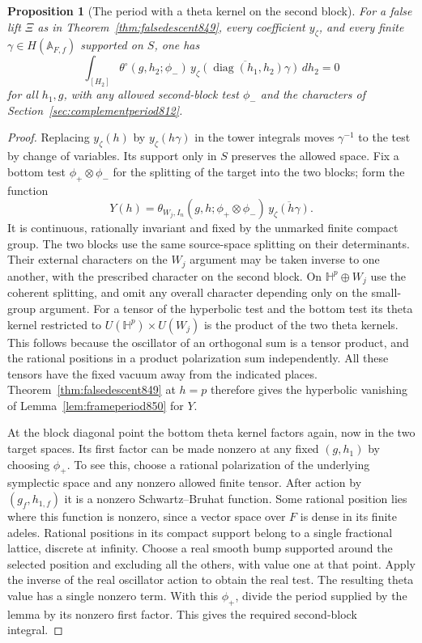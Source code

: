 \documentclass[a4paper,11pt]{article}
\newtheorem{proposition}{Proposition}[section]
\theoremstyle{definition}
\theoremstyle{remark}
\numberwithin{equation}{section}
\begin{document}
\begin{proposition}[The period with a theta kernel on the second block]
\leavevmode\label{prop:kernelperiod850}
For a false lift \(\Xi\) as in Theorem~\ref{thm:falsedescent849},
every coefficient \(y_\zeta\), and every finite
\(\gamma\in H(\mathbb A_{F,f})\) supported on \(S\), one has
\[
 \int_{[H_2]} \theta^\circ(g,h_2;\phi_-)\,
      \overline{y_\zeta(\operatorname{diag}(h_1,h_2)\gamma)}\,dh_2=0
\]
for all \(h_1,g\), with any allowed second-block test \(\phi_-\)
and the characters of Section~\ref{sec:complementperiod812}.
\end{proposition}
\begin{proof}
Replacing \(y_\zeta(h)\) by \(y_\zeta(h\gamma)\) in the tower
integrals moves \(\gamma^{-1}\) to the test by change of variables.
Its support only in \(S\) preserves the allowed space. Fix a
bottom test \(\phi_+\otimes\phi_-\) for the splitting of the
target into the two blocks; form the function
\[
        Y(h)=\theta_{W_j,I_n}(g,h;\phi_+\otimes\phi_-)\,
                                      \overline{y_\zeta(h\gamma)} .
\]
It is continuous, rationally invariant and fixed by the unmarked
finite compact group. The two blocks use the same source-space
splitting on their determinants. Their external characters on
the \(W_j\) argument may be taken inverse to one another,
with the prescribed character on the second block. On
\(\mathbb H^p\oplus W_j\) use the coherent splitting, and omit
any overall character depending only on the small-group argument.
For a tensor of the hyperbolic test and the bottom test its
theta kernel restricted to \(U(\mathbb H^p)\times U(W_j)\)
is the product of the two theta kernels. This follows because
the oscillator of an orthogonal sum is a tensor product, and the
rational positions in a product polarization sum independently.
All these tensors have the fixed vacuum away from the indicated
places. Theorem~\ref{thm:falsedescent849} at \(h=p\) therefore
gives the hyperbolic vanishing of Lemma~\ref{lem:frameperiod850}
for \(Y\).

At the block diagonal point the bottom theta kernel factors again,
now in the two target spaces. Its first factor can be made nonzero
at any fixed \((g,h_1)\) by choosing \(\phi_+\). To see this,
choose a rational polarization of the underlying symplectic
space and any nonzero allowed finite tensor. After action by
\((g_f,h_{1,f})\) it is a nonzero Schwartz--Bruhat function.
Some rational position lies where this function is nonzero,
since a vector space over \(F\) is dense in its finite adeles.
Rational positions in its compact support belong to a single
fractional lattice, discrete at infinity. Choose a real smooth
bump supported around the selected position and excluding all
the others, with value one at that point. Apply the inverse of
the real oscillator action to obtain the real test. The resulting
theta value has a single nonzero term. With this \(\phi_+\),
divide the period supplied by the lemma by its nonzero first
factor. This gives the required second-block integral.
\end{proof}
\end{document}
